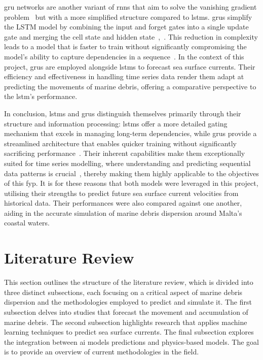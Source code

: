  \acrshort{gru} networks are another variant of \acrshort{rnn}s that aim to solve the vanishing gradient problem~\cite{31} but with a more simplified structure compared to \acrshort{lstm}s. \acrshort{gru}s simplify the LSTM model by combining the input and forget gates into a single update gate and merging the cell state and hidden state~\cite{32},~\cite{33}. This reduction in complexity leads to a model that is faster to train without significantly compromising the model's ability to capture dependencies in a sequence~\cite{32}. In the context of this project, \acrshort{gru}s are employed alongside \acrshort{lstm}s to forecast sea surface currents. Their efficiency and effectiveness in handling time series data render them adapt at predicting the movements of marine debris, offering a comparative perspective to the \acrshort{lstm}'s performance.

 In conclusion, \acrshort{lstm}s and \acrshort{gru}s distinguish themselves primarily through their structure and information processing: \acrshort{lstm}s offer a more detailed gating mechanism that excels in managing long-term dependencies, while \acrshort{gru}s provide a streamlined architecture that enables quicker training without significantly sacrificing performance~\cite{33}. Their inherent capabilities make them exceptionally suited for time series modelling, where understanding and predicting sequential data patterns is crucial~\cite{29}, thereby making them highly applicable to the objectives of this \acrshort{fyp}. It is for these reasons that both models were leveraged in this project, utilising their strengths to predict future sea surface current velocities from historical data. Their performances were also compared against one another, aiding in the accurate simulation of marine debris dispersion around Malta's coastal waters.

 \section{Literature Review}
\label{sec:literature_review}
This section outlines the structure of the literature review, which is divided into three distinct subsections, each focusing on a critical aspect of marine debris dispersion and the methodologies employed to predict and simulate it. The first subsection delves into studies that forecast the movement and accumulation of marine debris. The second subsection highlights research that applies machine learning techniques to predict sea surface currents. The final subsection explores the integration between \acrshort{ai} models predictions and physics-based models. The goal is to provide an overview of current methodologies in the field.

